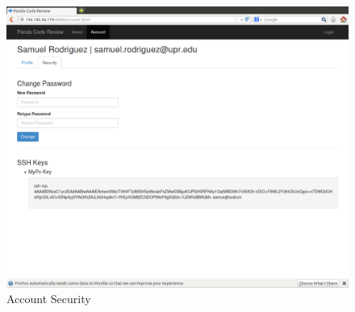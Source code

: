 \begin{figure}[H]
	\centering
	\includegraphics[width=\textwidth]{img/account-secutiry}
	\caption{Account Security}
\end{figure}
